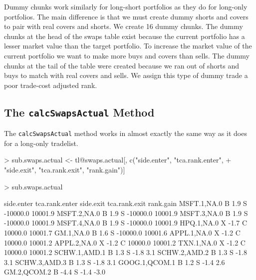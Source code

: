\documentclass{article}
\begin{document}
Dummy chunks work similarly for long-short portfolios as they do for
long-only portfolios.  The main difference is that we must create
dummy shorts and covers to pair with real covers and shorts.  We
create 16 dummy chunks.
The dummy chunks at the head of the swaps table exist because the
current portfolio has a lesser market value than the target portfolio.
To increase the market value of the current portfolio we want to make
more buys and covers than sells.  The dummy chunks at the tail of the
table were created because we ran out of shorts and buys to match with
real covers and sells.  We assign this type of dummy trade a poor
trade-cost adjusted rank.

\subsection{The \texttt{calcSwapsActual} Method}

The \texttt{calcSwapsActual} method works in almost exactly the same
way as it does for a long-only tradelist.

\begin{Schunk}
\begin{Sinput}
> sub.swaps.actual <- tl@swaps.actual[, c("side.enter", "tca.rank.enter", 
+     "side.exit", "tca.rank.exit", "rank.gain")]
\end{Sinput}
\end{Schunk}

\begin{Schunk}
\begin{Sinput}
> sub.swaps.actual
\end{Sinput}
\begin{Soutput}
              side.enter tca.rank.enter side.exit tca.rank.exit rank.gain
MSFT.1,NA.0            B            1.9         S      -10000.0   10001.9
MSFT.2,NA.0            B            1.9         S      -10000.0   10001.9
MSFT.3,NA.0            B            1.9         S      -10000.0   10001.9
MSFT.4,NA.0            B            1.9         S      -10000.0   10001.9
HPQ.1,NA.0             X           -1.7         C       10000.0   10001.7
GM.1,NA.0              B            1.6         S      -10000.0   10001.6
APPL.1,NA.0            X           -1.2         C       10000.0   10001.2
APPL.2,NA.0            X           -1.2         C       10000.0   10001.2
TXN.1,NA.0             X           -1.2         C       10000.0   10001.2
SCHW.1,AMD.1           B            1.3         S          -1.8       3.1
SCHW.2,AMD.2           B            1.3         S          -1.8       3.1
SCHW.3,AMD.3           B            1.3         S          -1.8       3.1
GOOG.1,QCOM.1          B            1.2         S          -1.4       2.6
GM.2,QCOM.2            B           -4.4         S          -1.4      -3.0
\end{Soutput}
\end{Schunk}
\end{document}
